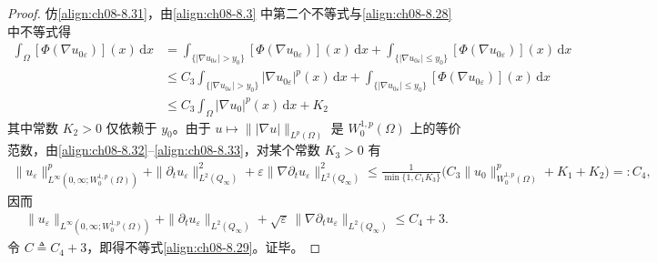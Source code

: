 \documentclass[../../main.tex]{subfiles}%
\begin{document}
\begin{proof}
仿\eqref{align:ch08-8.31}，由\eqref{align:ch08-8.3} 中第二个不等式与\eqref{align:ch08-8.28} 中不等式得
\begin{align}
\int_\Omega[\Phi(\nabla u_{0\varepsilon})](x)\,\mathrm{d}x
&=\int_{\{|\nabla u_{0\varepsilon}|>y_0\}}[\Phi(\nabla u_{0\varepsilon})](x)\,\mathrm{d}x
+\int_{\{|\nabla u_{0\varepsilon}|\leqslant y_0\}}[\Phi(\nabla u_{0\varepsilon})](x)\,\mathrm{d}x\nonumber\\
&\leqslant C_3\int_{\{|\nabla u_{0\varepsilon}|>y_0\}}|\nabla u_{0\varepsilon}|^p(x)\,\mathrm{d}x
+\int_{\{|\nabla u_{0\varepsilon}|\leqslant y_0\}}[\Phi(\nabla u_{0\varepsilon})](x)\,\mathrm{d}x\nonumber\\
&\leqslant C_3\int_\Omega|\nabla u_0|^p(x)\,\mathrm{d}x+K_2 \label{align:ch08-8.33}
\end{align}
其中常数 $K_2>0$ 仅依赖于 $y_0$。由于 $u\mapsto\||\nabla u|\|_{L^p(\Omega)}$ 是 $W^{1,p}_0(\Omega)$ 上的等价范数，由\eqref{align:ch08-8.32}--\eqref{align:ch08-8.33}，对某个常数 $K_3>0$ 有
\begin{align*}
\|u_\varepsilon\|^p_{L^\infty(0,\infty;W^{1,p}_0(\Omega))}
+\|\partial_t u_\varepsilon\|^2_{L^2(Q_\infty)}
+\varepsilon\|\nabla\partial_t u_\varepsilon\|^2_{L^2(Q_\infty)}
\leqslant\frac{1}{\min\{1,C_1K_3\}}\big(C_3\|u_0\|^p_{W^{1,p}_0(\Omega)}+K_1+K_2\big)=:C_4,
\end{align*}
因而
\begin{align*}
\|u_\varepsilon\|_{L^\infty(0,\infty;W^{1,p}_0(\Omega))}
+\|\partial_t u_\varepsilon\|_{L^2(Q_\infty)}
+\sqrt{\varepsilon}\,\|\nabla\partial_t u_\varepsilon\|_{L^2(Q_\infty)}\leqslant C_4+3.
\end{align*}
令 $C\triangleq C_4+3$，即得不等式\eqref{align:ch08-8.29}。证毕。
\end{proof}
\end{document}
